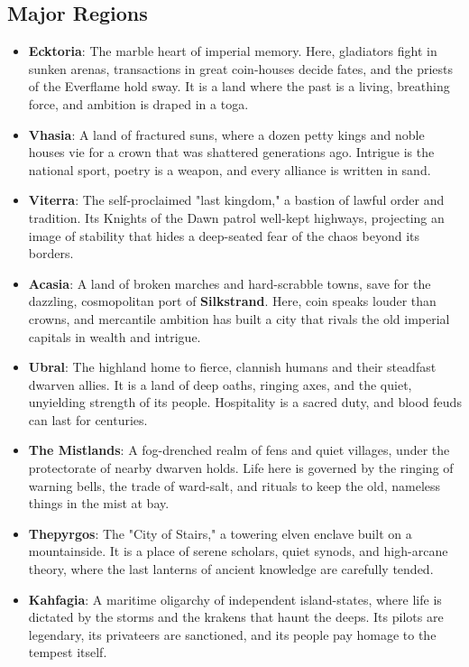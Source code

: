 \subsection*{Major Regions}

\begin{itemize}
    \item \textbf{Ecktoria}: The marble heart of imperial memory. Here, gladiators fight in sunken arenas, transactions in great coin-houses decide fates, and the priests of the Everflame hold sway. It is a land where the past is a living, breathing force, and ambition is draped in a toga.
    \item \textbf{Vhasia}: A land of fractured suns, where a dozen petty kings and noble houses vie for a crown that was shattered generations ago. Intrigue is the national sport, poetry is a weapon, and every alliance is written in sand.
    \item \textbf{Viterra}: The self-proclaimed "last kingdom," a bastion of lawful order and tradition. Its Knights of the Dawn patrol well-kept highways, projecting an image of stability that hides a deep-seated fear of the chaos beyond its borders.
    \item \textbf{Acasia}: A land of broken marches and hard-scrabble towns, save for the dazzling, cosmopolitan port of \textbf{Silkstrand}. Here, coin speaks louder than crowns, and mercantile ambition has built a city that rivals the old imperial capitals in wealth and intrigue.
    \item \textbf{Ubral}: The highland home to fierce, clannish humans and their steadfast dwarven allies. It is a land of deep oaths, ringing axes, and the quiet, unyielding strength of its people. Hospitality is a sacred duty, and blood feuds can last for centuries.
    \item \textbf{The Mistlands}: A fog-drenched realm of fens and quiet villages, under the protectorate of nearby dwarven holds. Life here is governed by the ringing of warning bells, the trade of ward-salt, and rituals to keep the old, nameless things in the mist at bay.
    \item \textbf{Thepyrgos}: The "City of Stairs," a towering elven enclave built on a mountainside. It is a place of serene scholars, quiet synods, and high-arcane theory, where the last lanterns of ancient knowledge are carefully tended.
    \item \textbf{Kahfagia}: A maritime oligarchy of independent island-states, where life is dictated by the storms and the krakens that haunt the deeps. Its pilots are legendary, its privateers are sanctioned, and its people pay homage to the tempest itself.
\end{itemize}

